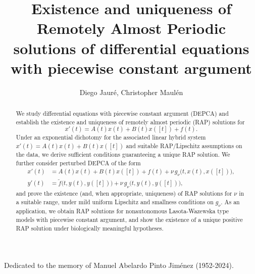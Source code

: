 \documentclass[english,,reqno]{amsart}
\numberwithin{equation}{section}
\theoremstyle{plain}
\theoremstyle{definition}
\theoremstyle{remark}
\begin{document}
\title{Existence and uniqueness of Remotely Almost Periodic solutions of differential equations with piecewise constant argument}

\author[Diego Jaur\'e, Christopher Maul\'en, Manuel Pinto]
{Diego Jaur\'e, Christopher Maul\'en}

\address{Diego Jaur\'e \newline
Facultad de Ingenier\'ia, Universidad de la Rep\'ublica Oriental del Uruguay}

\address{Christopher Maul\'en \newline
Departamento de Ingeniería Matemática, Facultad de Ciencias Físicas y Matemáticas, Universidad de Concepción, Concepción, Chile.}

\maketitle

{\centering Dedicated to the memory of Manuel Abelardo Pinto Jiménez (1952-2024).\par}

\begin{abstract}
We study differential equations with piecewise constant argument (DEPCA) and establish the existence and uniqueness of remotely almost periodic (RAP) solutions for
\[
x'(t)=A(t)x(t)+B(t)x([t])+f(t).
\]
Under an exponential dichotomy for the associated linear hybrid system \(x'(t)=A(t)x(t)+B(t)x([t])\) and suitable RAP/Lipschitz assumptions on the data, we derive sufficient conditions guaranteeing a unique RAP solution. We further consider perturbed DEPCA of the form
\[
\begin{aligned}
x'(t)&=A(t)x(t)+B(t)x([t])+f(t)+\nu\,g_{\nu}\bigl(t,x(t),x([t])\bigr),\\
y'(t)&=\tilde f\bigl(t,y(t),y([t])\bigr)+\nu\,g_{\nu}\bigl(t,y(t),y([t])\bigr),
\end{aligned}
\]
and prove the existence (and, when appropriate, uniqueness) of RAP solutions for \(\nu\) in a suitable range, under mild uniform Lipschitz and smallness conditions on \(g_{\nu}\). As an application, we obtain RAP solutions for nonautonomous Lasota-Wazewska type models with piecewise constant argument, and show the existence of a unique positive RAP solution under biologically meaningful hypotheses.
\end{abstract}

\maketitle
\end{document}
